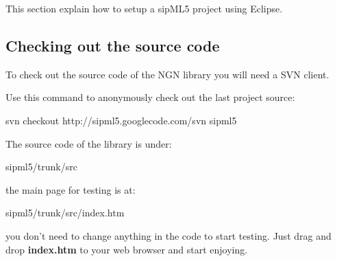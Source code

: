 \label{page___setting__up_sip_m_l5_project_page__Setting_Up_sipML5_project}%
This section explain how to setup a sip\-M\-L5 project using Eclipse.\par


\subsection*{Checking out the source code}

To check out the source code of the N\-G\-N library you will need a S\-V\-N client.\par
 Use this command to anonymously check out the last project source\-: 
\begin{DoxyCode}
svn checkout http://sipml5.googlecode.com/svn sipml5
\end{DoxyCode}
 The source code of the library is under\-: 
\begin{DoxyCode}
sipml5/trunk/src
\end{DoxyCode}
 the main page for testing is at\-: 
\begin{DoxyCode}
sipml5/trunk/src/index.htm
\end{DoxyCode}
 you don't need to change anything in the code to start testing. Just drag and drop {\bfseries index.\-htm} to your web browser and start enjoying. 